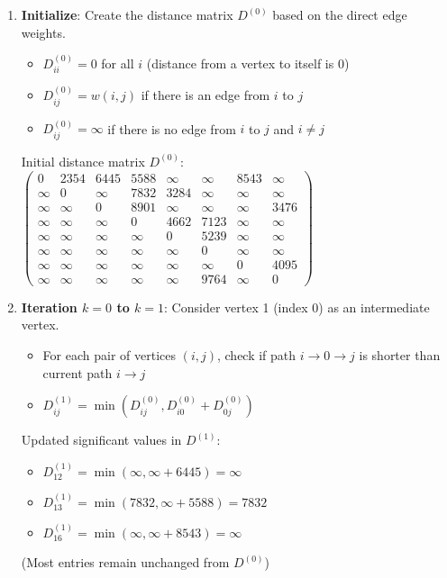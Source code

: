 \documentclass{article}
\theoremstyle{definition}
\begin{document}
\begin{enumerate}
\item \textbf{Initialize}: Create the distance matrix $D^{(0)}$ based on the direct edge weights.
   \begin{itemize}
   \item $D^{(0)}_{ii} = 0$ for all $i$ (distance from a vertex to itself is 0)
   \item $D^{(0)}_{ij} = w(i,j)$ if there is an edge from $i$ to $j$
   \item $D^{(0)}_{ij} = \infty$ if there is no edge from $i$ to $j$ and $i \neq j$
   \end{itemize}

   Initial distance matrix $D^{(0)}$:
   $\begin{pmatrix}
   0 & 2354 & 6445 & 5588 & \infty & \infty & 8543 & \infty \\
   \infty & 0 & \infty & 7832 & 3284 & \infty & \infty & \infty \\
   \infty & \infty & 0 & 8901 & \infty & \infty & \infty & 3476 \\
   \infty & \infty & \infty & 0 & 4662 & 7123 & \infty & \infty \\
   \infty & \infty & \infty & \infty & 0 & 5239 & \infty & \infty \\
   \infty & \infty & \infty & \infty & \infty & 0 & \infty & \infty \\
   \infty & \infty & \infty & \infty & \infty & \infty & 0 & 4095 \\
   \infty & \infty & \infty & \infty & \infty & 9764 & \infty & 0
   \end{pmatrix}$

\item \textbf{Iteration $k=0$ to $k=1$}: Consider vertex 1 (index 0) as an intermediate vertex.
   \begin{itemize}
   \item For each pair of vertices $(i,j)$, check if path $i \rightarrow 0 \rightarrow j$ is shorter than current path $i \rightarrow j$
   \item $D^{(1)}_{ij} = \min(D^{(0)}_{ij}, D^{(0)}_{i0} + D^{(0)}_{0j})$
   \end{itemize}

   Updated significant values in $D^{(1)}$:
   \begin{itemize}
   \item $D^{(1)}_{12} = \min(\infty, \infty + 6445) = \infty$
   \item $D^{(1)}_{13} = \min(7832, \infty + 5588) = 7832$
   \item $D^{(1)}_{16} = \min(\infty, \infty + 8543) = \infty$
   \end{itemize}
   (Most entries remain unchanged from $D^{(0)}$)


\end{enumerate}
\end{document}
